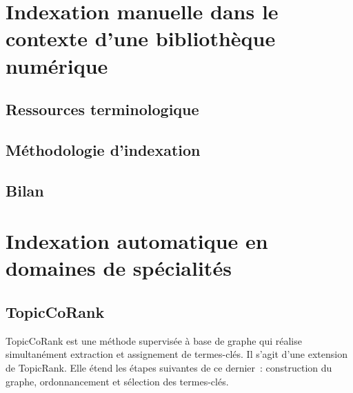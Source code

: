 
  \section{Indexation manuelle dans le contexte d'une bibliothèque numérique}
  \label{sec:main-domain_specific_keyphrase_annotation-manual_keyphrase_annotation}
    \TODO{\dots}

    \subsection{Ressources terminologique}
    \label{subsec:main-domain_specific_keyphrase_annotation-manual_keyphrase_annotation-resources}
      \TODO{\dots}

    \subsection{Méthodologie d'indexation}
    \label{subsec:main-domain_specific_keyphrase_annotation-manual_keyphrase_annotation-methodology}
      \TODO{\dots}

    \subsection{Bilan}
    \label{subsec:main-domain_specific_keyphrase_annotation-manual_keyphrase_annotation-conclusion}


  \section{Indexation automatique en domaines de spécialités}
  \label{sec:main-domain_specific_keyphrase_annotation-supervised_automatic_keyphrase_extraction}
    \TODO{\dots}

    \subsection{TopicCoRank}
    \label{subsec:main-domain_specific_keyphrase_annotation-supervised_automatic_keyphrase_annotation-topiccorank}
      TopicCoRank est une méthode supervisée à base de graphe qui réalise
      simultanément extraction et assignement de termes-clés. Il s'agit d'une
      extension de TopicRank. Elle étend les étapes suivantes de ce dernier~:
      construction du graphe, ordonnancement et sélection des termes-clés.

